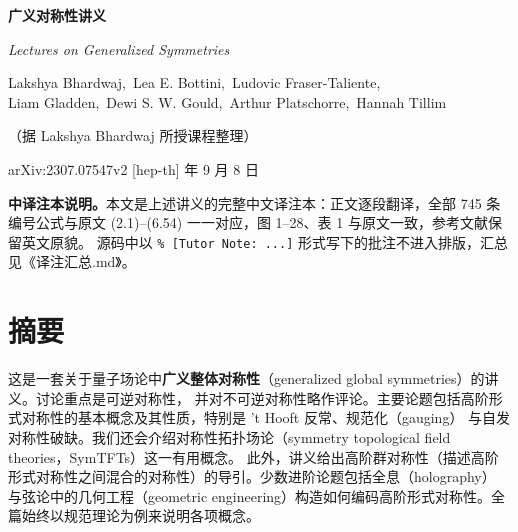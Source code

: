 
\begin{titlepage}
\centering
\vspace*{2cm}
{\LARGE\bfseries 广义对称性讲义\par}
\vspace{0.5em}
{\large\itshape Lectures on Generalized Symmetries\par}
\vspace{2.2em}
{\large Lakshya Bhardwaj,\ Lea E. Bottini,\ Ludovic Fraser-Taliente,\\[2pt]
Liam Gladden,\ Dewi S. W. Gould,\ Arthur Platschorre,\ Hannah Tillim\par}
\vspace{1em}
{\small（据 Lakshya Bhardwaj 所授课程整理）\par}
\vspace{2em}
{\small arXiv:2307.07547v2 [hep-th] 年 9 月 8 日\par}
\vfill
\begin{minipage}{0.86\textwidth}
\small
\textbf{中译注本说明。}本文是上述讲义的完整中文译注本：正文逐段翻译，全部 745 条编号公式与原文
(2.1)--(6.54) 一一对应，图 1--28、表 1 与原文一致，参考文献保留英文原貌。
源码中以 \texttt{\% [Tutor Note: ...]} 形式写下的批注不进入排版，汇总见《译注汇总.md》。
\end{minipage}
\vspace{1.2em}
\end{titlepage}

\section*{摘要}

这是一套关于量子场论中\textbf{广义整体对称性}（generalized global symmetries）的讲义。讨论重点是可逆对称性，
并对不可逆对称性略作评论。主要论题包括高阶形式对称性的基本概念及其性质，特别是 't Hooft 反常、规范化（gauging）
与自发对称性破缺。我们还会介绍对称性拓扑场论（symmetry topological field theories，SymTFTs）这一有用概念。
此外，讲义给出高阶群对称性（描述高阶形式对称性之间混合的对称性）的导引。少数进阶论题包括全息（holography）
与弦论中的几何工程（geometric engineering）构造如何编码高阶形式对称性。全篇始终以规范理论为例来说明各项概念。

\vspace{1.2em}

\tableofcontents

\clearpage
